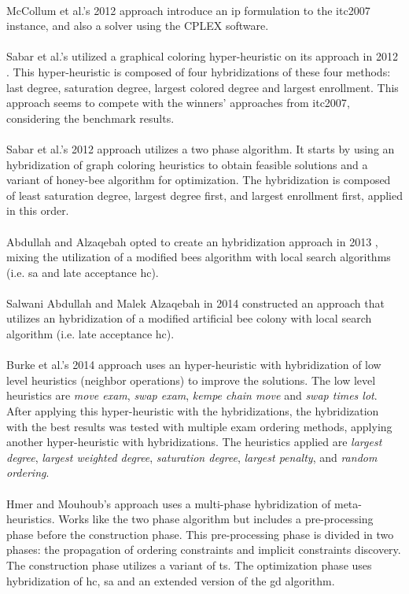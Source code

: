 \\
McCollum et al.'s 2012 approach \cite{McCollum2012} introduce an \gls{ip} formulation to the \gls{itc2007} instance, and also a solver using the CPLEX software.\\
\\
Sabar et al.'s utilized a graphical coloring hyper-heuristic on its approach in 2012 \cite{Sabar2012}. This hyper-heuristic is composed of four hybridizations of these four methods: last degree, saturation degree, largest colored degree and largest enrollment. This approach seems to compete with the winners' approaches from \gls{itc2007}, considering the benchmark results.\\
\\
Sabar et al.'s 2012 approach \cite{Sabar2012a} utilizes a two phase algorithm. It starts by using an hybridization of graph coloring heuristics to obtain feasible solutions and a variant of honey-bee algorithm for optimization. The hybridization is composed of least saturation degree, largest degree first, and largest enrollment first, applied in this order.\\
\\
Abdullah and Alzaqebah opted to create an hybridization approach in 2013 \cite{Abdullah2013}, mixing the utilization of a modified bees algorithm with local search algorithms (i.e. \gls{sa} and late acceptance \gls{hc}).\\
\\
Salwani Abdullah and Malek Alzaqebah in 2014 constructed an approach \cite{Alzaqebah2014} that utilizes an hybridization of a modified artificial bee colony with local search algorithm (i.e. late acceptance \gls{hc}).\\
\\
Burke et al.'s 2014 approach \cite{Burke2014} uses an hyper-heuristic with hybridization of low level heuristics (neighbor operations) to improve the solutions. The low level heuristics are \textit{move exam}, \textit{swap exam}, \textit{kempe chain move} and \textit{swap times lot}. After applying this hyper-heuristic with the hybridizations, the hybridization with the best results was tested with multiple exam ordering methods, applying another hyper-heuristic with hybridizations. The heuristics applied are \textit{largest degree}, \textit{largest weighted degree}, \textit{saturation degree}, \textit{largest penalty}, and \textit{random ordering}.\\
\\
Hmer and Mouhoub's approach \cite{Mouhoub2014} uses a multi-phase hybridization of meta-heuristics. Works like the two phase algorithm but includes a pre-processing phase before the construction phase. This pre-processing phase is divided in two phases: the propagation of ordering constraints and implicit constraints discovery. The construction phase utilizes a variant of \gls{ts}. The optimization phase uses hybridization of \gls{hc}, \gls{sa} and an extended version of the \gls{gd} algorithm.\\
